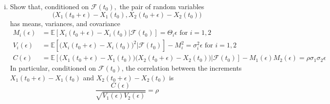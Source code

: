 \documentclass{article}
\newcommand{\E}{\mathbb{E}}
\newcommand{\F}{\mathcal{F}}
\newcommand{\eps}{\epsilon}
\theoremstyle{definition}
\theoremstyle{definition}
\begin{document}
\begin{enumerate}
\begin{enumerate}[(i)]
\begin{proof}
        $$ LHS = \big(B_1(t_0+\eps)-B_1(t_0)\big)\big(B_2(t_0+\eps)-B_2(t_0)\big)$$
        Then
        \begin{align*}
            \E[LHS] &= \E[B_1(t_0+\eps)B_2(t_0+\eps)+B_1(t_0)B_2(t_0) \\
            & \hspace{2cm} -B_1(t_0+\eps)B_2(t_0) -B_1(t_0)B_2(t_0+\eps)|\F(t_0)] \\
            &= \E[B_1(t_0+\eps)B_2(t_0+\eps)|\F(t_0)]+\E[B_1(t_0)B_2(t_0)|\F(t_0)] \\
            & \hspace{2cm}  -\E[B_1(t_0+\eps)B_2(t_0)|\F(t_0)]-\E[B_1(t_0)B_2(t_0+\eps)|\F(t_0)] \\
            &= B_1(t_0)B_2(t_0) + \rho \eps + B_1(t_0)B_2(t_0) - B_2(t_0)\E[B_1(t_0+\eps)|\F(t_0)] -B_1(t_0)\E[B_2(t_0+\eps)|\F(t_0)] \\
            &= B_1(t_0)B_2(t_0) + \rho \eps + B_1(t_0)B_2(t_0) - B_2(t_0)B_1(t_0) -B_1(t_0)B_2(t_0) = \rho \eps
        \end{align*}
        
        In the first line, we distributed the product of $LHS$; in the second line we used linearity of conditional expectations to distribute the expectation across the elements of the sum; in the third line we took out the $\F(t_0)$-measurable elements out of the expectation; and in the final line, we used the property of Brownian motions that they are martingales, i.e. that $\E[B_1(t_0+\eps)|\F(t_0)]=B_1(t_0)$
        
        
        
        
        \end{proof}
        
        \item Show that, conditioned on $\F(t_0),$ the pair of random variables
        $$ \big( X_1(t_0+\eps)-X_1(t_0),X_2(t_0+\eps)-X_2(t_0)\big)$$
        has means, variances, and covariance
        \begin{align}
            M_i(\eps) &= \E\left[ X_i(t_0+\eps)-X_i(t_0)|\F(t_0)\right] = \Theta_i \eps \text{ for } i=1,2 \tag{4.10.28} \\
            V_i(\eps) &= \E\left[ \big( X_i(t_0+\eps)-X_i(t_0)\big)^2|\F(t_0)\right]-M_i^2 = \sigma_i^2 \eps \text{ for } i=1,2 \tag{4.10.29} \\
            C(\eps) &= \E\left[ \big( X_1(t_0+\eps)-X_1(t_0)\big)\big( X_2(t_0+\eps)-X_2(t_0)\big)|\F(t_0)\right]-M_1(\eps)M_2(\eps) = \rho \sigma_1 \sigma_2 \eps \tag{4.10.30}
        \end{align}
        In particular, conditioned on $\F(t_0)$, the correlation between the increments $X_1(t_0+\eps)-X_1(t_0)$ and $X_2(t_0+\eps)-X_2(t_0)$ is
        $$ \frac{C(\eps)}{\sqrt{V_1(\eps)V_2(\eps)}}=\rho$$
        

\end{enumerate}
\end{enumerate}
\end{document}
